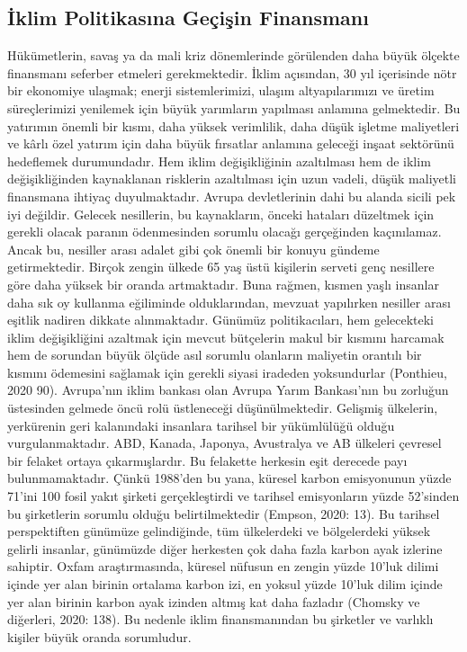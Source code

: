 \documentclass[
]{book}
\begin{document}
\hypertarget{iklim-politikasux131na-geuxe7iux15fin-finansmanux131}{%
\subsection{İklim Politikasına Geçişin Finansmanı}\label{iklim-politikasux131na-geuxe7iux15fin-finansmanux131}}

Hükümetlerin, savaş ya da mali kriz dönemlerinde görülenden daha büyük ölçekte finansmanı seferber etmeleri gerekmektedir. İklim açısından, 30 yıl içerisinde nötr bir ekonomiye ulaşmak; enerji sistemlerimizi, ulaşım altyapılarımızı ve üretim süreçlerimizi yenilemek için büyük yarımların yapılması anlamına gelmektedir. Bu yatırımın önemli bir kısmı, daha yüksek verimlilik, daha düşük işletme maliyetleri ve kârlı özel yatırım için daha büyük fırsatlar anlamına geleceği inşaat sektörünü hedeflemek durumundadır. Hem iklim değişikliğinin azaltılması hem de iklim değişikliğinden kaynaklanan risklerin azaltılması için uzun vadeli, düşük maliyetli finansmana ihtiyaç duyulmaktadır. Avrupa devletlerinin dahi bu alanda sicili pek iyi değildir. Gelecek nesillerin, bu kaynakların, önceki hataları düzeltmek için gerekli olacak paranın ödenmesinden sorumlu olacağı gerçeğinden kaçınılamaz. Ancak bu, nesiller arası adalet gibi çok önemli bir konuyu gündeme getirmektedir. Birçok zengin ülkede 65 yaş üstü kişilerin serveti genç nesillere göre daha yüksek bir oranda artmaktadır. Buna rağmen, kısmen yaşlı insanlar daha sık oy kullanma eğiliminde olduklarından, mevzuat yapılırken nesiller arası eşitlik nadiren dikkate alınmaktadır. Günümüz politikacıları, hem gelecekteki iklim değişikliğini azaltmak için mevcut bütçelerin makul bir kısmını harcamak hem de sorundan büyük ölçüde asıl sorumlu olanların maliyetin orantılı bir kısmını ödemesini sağlamak için gerekli siyasi iradeden yoksundurlar (Ponthieu, 2020 90). Avrupa'nın iklim bankası olan Avrupa Yarım Bankası'nın bu zorluğun üstesinden gelmede öncü rolü üstleneceği düşünülmektedir.
Gelişmiş ülkelerin, yerkürenin geri kalanındaki insanlara tarihsel bir yükümlülüğü olduğu vurgulanmaktadır. ABD, Kanada, Japonya, Avustralya ve AB ülkeleri çevresel bir felaket ortaya çıkarmışlardır. Bu felakette herkesin eşit derecede payı bulunmamaktadır. Çünkü 1988'den bu yana, küresel karbon emisyonunun yüzde 71'ini 100 fosil yakıt şirketi gerçekleştirdi ve tarihsel emisyonların yüzde 52'sinden bu şirketlerin sorumlu olduğu belirtilmektedir (Empson, 2020: 13). Bu tarihsel perspektiften günümüze gelindiğinde, tüm ülkelerdeki ve bölgelerdeki yüksek gelirli insanlar, günümüzde diğer herkesten çok daha fazla karbon ayak izlerine sahiptir. Oxfam araştırmasında, küresel nüfusun en zengin yüzde 10'luk dilimi içinde yer alan birinin ortalama karbon izi, en yoksul yüzde 10'luk dilim içinde yer alan birinin karbon ayak izinden altmış kat daha fazladır (Chomsky ve diğerleri, 2020: 138). Bu nedenle iklim finansmanından bu şirketler ve varlıklı kişiler büyük oranda sorumludur.
\end{document}
